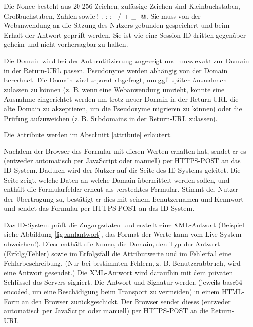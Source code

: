 \documentclass[parskip=half]{scrartcl}
\begin{document}
Die Nonce besteht aus 20-256 Zeichen, zulässige Zeichen sind Kleinbuchstaben, Großbuchstaben, Zahlen sowie \verb@ ! . : ; | / + _ -@.
Sie muss von der Webanwendung an die Sitzung des Nutzers gebunden gespeichert und beim Erhalt der Antwort geprüft werden.
Sie ist wie eine Session-ID dritten gegenüber geheim und nicht vorhersagbar zu halten.

Die Domain wird bei der Authentifizierung angezeigt und muss exakt zur Domain in der Return-URL passen.
Pseudonyme werden abhängig von der Domain berechnet.
Die Domain wird separat abgefragt, um ggf. später Ausnahmen zulassen zu können
(z. B. wenn eine Webanwendung umzieht, könnte eine Ausnahme eingerichtet werden um trotz neuer Domain in der Return-URL die alte Domain zu akzeptieren,
um die Pseudonyme migrieren zu können) oder die Prüfung aufzuweichen (z. B. Subdomains in der Return-URL zulassen).

Die Attribute werden im Abschnitt \ref{attribute} erläutert.

Nachdem der Browser das Formular mit diesen Werten erhalten hat, sendet er es (entweder automatisch per JavaScript oder manuell) per HTTPS-POST an das ID-System.
Dadurch wird der Nutzer auf die Seite des ID-Systems geleitet.
Die Seite zeigt, welche Daten an welche Domain übermittelt werden sollen, und enthält die Formularfelder erneut als verstecktes Formular.
Stimmt der Nutzer der Übertragung zu, bestätigt er dies mit seinem Benutzernamen und Kennwort und sendet das Formular per HTTPS-POST an das ID-System.

Das ID-System prüft die Zugangsdaten und erstellt eine XML-Antwort (Beispiel siehe Abbildung \ref{fig:xmlantwort}, das Format der Werte kann vom Live-System abweichen!).
Diese enthält die Nonce, die Domain, den Typ der Antwort (Erfolg/Fehler) sowie im Erfolgsfall die Attributwerte und im Fehlerfall eine Fehlerbeschreibung.
(Nur bei bestimmten Fehlern, z. B. Benutzerabbruch, wird eine Antwort gesendet.)
Die XML-Antwort wird daraufhin mit dem privaten Schlüssel des Servers signiert.
Die Antwort und Signatur werden (jeweils base64-encoded, um eine Beschädigung beim Transport zu vermeiden) in einem HTML-Form an den Browser zurückgeschickt.
Der Browser sendet dieses (entweder automatisch per JavaScript oder manuell) per HTTPS-POST an die Return-URL.
\end{document}
